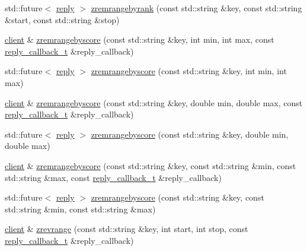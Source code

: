 \begin{DoxyCompactItemize}
\item 
std\+::future$<$ \hyperlink{classcpp__redis_1_1reply}{reply} $>$ \hyperlink{classcpp__redis_1_1client_a2215c127cf351c43b69f62d871e7acb7}{zremrangebyrank} (const std\+::string \&key, const std\+::string \&start, const std\+::string \&stop)
\item 
\hyperlink{classcpp__redis_1_1client}{client} \& \hyperlink{classcpp__redis_1_1client_a8de95c0d340cc58d81fe5ca9b576d5b8}{zremrangebyscore} (const std\+::string \&key, int min, int max, const \hyperlink{classcpp__redis_1_1client_a061a1140d36d2eaeda82b09a0bb3f9f2}{reply\+\_\+callback\+\_\+t} \&reply\+\_\+callback)
\item 
std\+::future$<$ \hyperlink{classcpp__redis_1_1reply}{reply} $>$ \hyperlink{classcpp__redis_1_1client_a1317e67f2993b71bce596d28bce009b9}{zremrangebyscore} (const std\+::string \&key, int min, int max)
\item 
\hyperlink{classcpp__redis_1_1client}{client} \& \hyperlink{classcpp__redis_1_1client_a62354f918bcc9fd99562f1fe25dadec7}{zremrangebyscore} (const std\+::string \&key, double min, double max, const \hyperlink{classcpp__redis_1_1client_a061a1140d36d2eaeda82b09a0bb3f9f2}{reply\+\_\+callback\+\_\+t} \&reply\+\_\+callback)
\item 
std\+::future$<$ \hyperlink{classcpp__redis_1_1reply}{reply} $>$ \hyperlink{classcpp__redis_1_1client_ab40737e3dd44d39d708ab9e545f1d068}{zremrangebyscore} (const std\+::string \&key, double min, double max)
\item 
\hyperlink{classcpp__redis_1_1client}{client} \& \hyperlink{classcpp__redis_1_1client_a4a9c526f56dc158345f359961c9f9a7d}{zremrangebyscore} (const std\+::string \&key, const std\+::string \&min, const std\+::string \&max, const \hyperlink{classcpp__redis_1_1client_a061a1140d36d2eaeda82b09a0bb3f9f2}{reply\+\_\+callback\+\_\+t} \&reply\+\_\+callback)
\item 
std\+::future$<$ \hyperlink{classcpp__redis_1_1reply}{reply} $>$ \hyperlink{classcpp__redis_1_1client_afdef5244240e2c54c9738be66807e8f6}{zremrangebyscore} (const std\+::string \&key, const std\+::string \&min, const std\+::string \&max)
\item 
\hyperlink{classcpp__redis_1_1client}{client} \& \hyperlink{classcpp__redis_1_1client_ad408a62269d10de02605de9acec1ddc0}{zrevrange} (const std\+::string \&key, int start, int stop, const \hyperlink{classcpp__redis_1_1client_a061a1140d36d2eaeda82b09a0bb3f9f2}{reply\+\_\+callback\+\_\+t} \&reply\+\_\+callback)
\item 

\end{DoxyCompactItemize}
